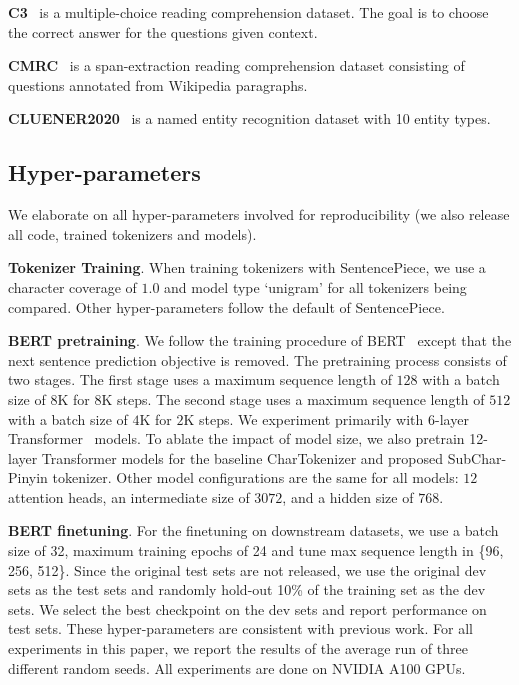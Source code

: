 \noindent \textbf{C3}~\cite{C3} is a multiple-choice reading comprehension dataset. The goal is to choose the correct answer for the questions given context. 

\noindent \textbf{CMRC}~\cite{CMRC} is a span-extraction reading comprehension dataset consisting of questions annotated from Wikipedia paragraphs.

\noindent \textbf{CLUENER2020}~\cite{CLUENER} is a named entity recognition dataset with 10 entity types. 

% 



\subsection{Hyper-parameters}

We elaborate on all hyper-parameters involved for reproducibility (we also release all code, trained tokenizers and models). 


\textbf{Tokenizer Training}.
When training tokenizers with SentencePiece, we use a character coverage of $1.0$ and model type `unigram' for all tokenizers being compared. Other hyper-parameters follow the default of SentencePiece.



\textbf{BERT pretraining}. We follow the training procedure of BERT~\cite{BERT} except that the next sentence prediction objective is removed. The pretraining process consists of two stages. The first stage uses a maximum sequence length of $128$ with a batch size of $8$K for $8$K steps. The second stage uses a maximum sequence length of $512$ with a batch size of $4$K for $2$K steps. We experiment primarily with  $6$-layer Transformer~\cite{Transformer} models. To ablate the impact of model size, we also pretrain 12-layer Transformer models for the baseline CharTokenizer and proposed SubChar-Pinyin tokenizer. 
Other model configurations are the same for all models: $12$ attention heads, an intermediate size of $3072$, and a hidden size of $768$.


\textbf{BERT finetuning}.
For the finetuning on downstream datasets, 
we use a batch size of 32, maximum training epochs of 24 and tune max sequence length in \{96, 256, 512\}. Since the original test sets are not released, we use the original dev sets as the test sets and randomly hold-out 10\% of the training set as the dev sets. We select the best checkpoint on the dev sets and report performance on test sets.
These hyper-parameters are consistent with previous work.
For all experiments in this paper, we report the results of the average run of three different random seeds.
All experiments are done on NVIDIA A100 GPUs.


